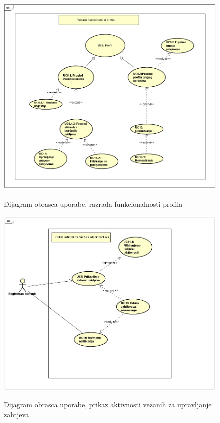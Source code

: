 \begin{figure}[H]
	\includegraphics[scale=0.65]{slike/uc_profil.png} %
	\centering
	\caption \newline Dijagram obrasca uporabe, razrada funkcionalnosti profila
	\label{fig:promjene}
\end{figure}		

\begin{figure}[H]
	\includegraphics[scale=0.65]{slike/uc_odabir_zahtjeva.jpg} %
	\centering
	\caption \newline Dijagram obrasca uporabe, prikaz aktivnosti vezanih za upravljanje zahtjeva
	\label{fig:promjene}
\end{figure}

